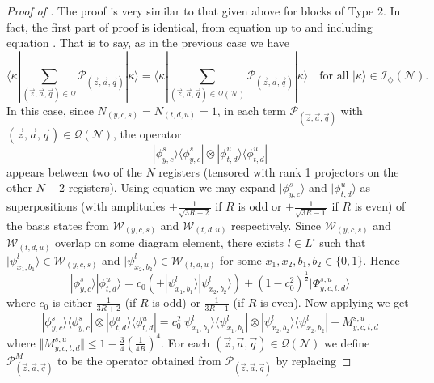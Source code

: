 \documentclass[../thesis-main/thesis-main]{subfiles}
\begin{document}
\begin{proof}[Proof of \protect{}]
The proof is very similar to that given above for blocks of Type 2. In fact, the first part of proof is identical, from equation  up to and including equation . That is to say, as in the previous case we have
\begin{equation}
\langle\kappa|\sum_{(\vec{z},\vec{a},\vec{q})\in\mathcal{Q}}\mathcal{P}_{(\vec{z},\vec{a},\vec{q})}|\kappa\rangle=\langle\kappa|\sum_{(\vec{z},\vec{a},\vec{q})\in\mathcal{Q}(\mathcal{N})}\mathcal{P}_{(\vec{z},\vec{a},\vec{q})}|\kappa\rangle\quad\text{for all }|\kappa\rangle\in\mathcal{I}_{\diamondsuit}(\mathcal{N}).\label{eq:restrict_attention_mathcalN-1}
\end{equation}
In this case, since $N_{(y,c,s)}=N_{(t,d,u)}=1$, in each term $\mathcal{P}_{(\vec{z},\vec{a},\vec{q})}$ with $(\vec{z},\vec{a},\vec{q})\in\mathcal{Q}(\mathcal{N})$, the operator 
\[
|\phi_{y,c}^{s}\rangle\langle\phi_{y,c}^{s}|\otimes|\phi_{t,d}^{u}\rangle\langle\phi_{t,d}^{u}|
\]
appears between two of the $N$ registers (tensored with rank 1 projectors on the other $N-2$ registers). Using equation  we may expand $|\phi_{y,c}^{s}\rangle$ and $|\phi_{t,d}^{u}\rangle$ as superpositions (with amplitudes $\pm\frac{1}{\sqrt{3R+2}}$ if $R$ is odd or $\pm\frac{1}{\sqrt{3R-1}}$ if $R$ is even) of the basis states from $\mathcal{W}_{(y,c,s)}$ and $\mathcal{W}_{(t,d,u)}$ respectively. Since $\mathcal{W}_{(y,c,s)}$ and $\mathcal{W}_{(t,d,u)}$ overlap on some diagram element, there exists $l\in L^{\square}$ such that $|\psi_{x_{1},b_{1}}^{l}\rangle\in\mathcal{W}_{(y,c,s)}$ and $|\psi_{x_{2},b_{2}}^{l}\rangle\in\mathcal{W}_{(t,d,u)}$ for some $x_{1},x_{2},b_{1},b_{2}\in\{0,1\}$. Hence
\[
|\phi_{y,c}^{s}\rangle|\phi_{t,d}^{u}\rangle=c_{0}\left(\pm|\psi_{x_{1},b_{1}}^{l}\rangle|\psi_{x_{2},b_{2}}^{l}\rangle\right)+\left(1-c_{0}^{2}\right)^{\frac{1}{2}}|\Phi_{y,c,t,d}^{s,u}\rangle
\]
where $c_{0}$ is either $\frac{1}{3R+2}$ (if $R$ is odd) or $\frac{1}{3R-1}$ (if $R$ is even). Now applying  we get
\begin{equation}
|\phi_{y,c}^{s}\rangle\langle\phi_{y,c}^{s}|\otimes|\phi_{t,d}^{u}\rangle\langle\phi_{t,d}^{u}|=c_{0}^{2}|\psi_{x_{1},b_{1}}^{l}\rangle\langle\psi_{x_{1},b_{1}}^{l}|\otimes|\psi_{x_{2},b_{2}}^{l}\rangle\langle\psi_{x_{2},b_{2}}^{l}|+M_{y,c,t,d}^{s,u}\label{eq:expand_phi_phi_proj-1-1}
\end{equation}
where $\Vert M_{y,c,t,d}^{s,u}\Vert \leq1-\frac{3}{4}\left(\frac{1}{4R}\right)^{4}$. For each $(\vec{z},\vec{a},\vec{q})\in\mathcal{Q}(\mathcal{N})$ we define $\mathcal{P}_{(\vec{z},\vec{a},\vec{q})}^{M}$ to be the operator obtained from $\mathcal{P}_{(\vec{z},\vec{a},\vec{q})}$ by replacing

\end{proof}
\end{document}
